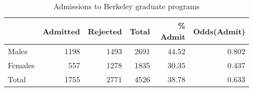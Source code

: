 \begin{table}[htb]
\caption{Admissions to Berkeley graduate programs}
\label{tab:berk22}
 \begin{center}
\begin{tabular}{lrr|rrr}
\hline
  & Admitted & Rejected & Total & \% Admit & Odds(Admit)\\
\hline
 Males & 1198 & 1493 & 2691  & 44.52 & 0.802\\
 Females & 557 & 1278 & 1835 & 30.35 & 0.437\\
\hline
 Total & 1755 & 2771 & 4526  & 38.78 & 0.633\\
\hline
\end{tabular}
\end{center}
\end{table}
